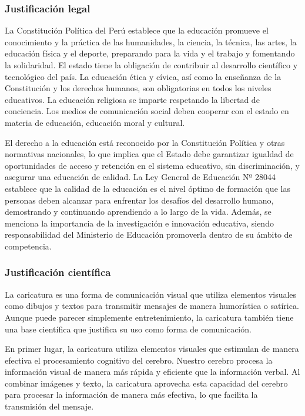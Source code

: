 \documentclass[12pt,a4paper]{article}
\begin{document}
\subsubsection{Justificación legal}
La Constitución Política del Perú establece que la educación promueve el conocimiento y la práctica de las humanidades, la ciencia, la técnica, las artes, la educación física y el deporte, preparando para la vida y el trabajo y fomentando la solidaridad. El estado tiene la obligación de contribuir al desarrollo científico y tecnológico del país. La educación ética y cívica, así como la enseñanza de la Constitución y los derechos humanos, son obligatorias en todos los niveles educativos. La educación religiosa se imparte respetando la libertad de conciencia. Los medios de comunicación social deben cooperar con el estado en materia de educación, educación moral y cultural.

El derecho a la educación está reconocido por la Constitución Política y otras normativas nacionales, lo que implica que el Estado debe garantizar igualdad de oportunidades de acceso y retención en el sistema educativo, sin discriminación, y asegurar una educación de calidad. La Ley General de Educación Nº 28044 establece que la calidad de la educación es el nivel óptimo de formación que las personas deben alcanzar para enfrentar los desafíos del desarrollo humano, demostrando y continuando aprendiendo a lo largo de la vida. Además, se menciona la importancia de la investigación e innovación educativa, siendo responsabilidad del Ministerio de Educación promoverla dentro de su ámbito de competencia.


\subsubsection{Justificación científica}
La caricatura es una forma de comunicación visual que utiliza elementos visuales como dibujos y textos para transmitir mensajes de manera humorística o satírica. Aunque puede parecer simplemente entretenimiento, la caricatura también tiene una base científica que justifica su uso como forma de comunicación.

En primer lugar, la caricatura utiliza elementos visuales que estimulan de manera efectiva el procesamiento cognitivo del cerebro. Nuestro cerebro procesa la información visual de manera más rápida y eficiente que la información verbal. Al combinar imágenes y texto, la caricatura aprovecha esta capacidad del cerebro para procesar la información de manera más efectiva, lo que facilita la transmisión del mensaje.
\end{document}
